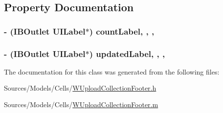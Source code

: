 \subsection{Property Documentation}
\hypertarget{interface_w_upload_collection_footer_a26070c07f674fc97b8c8a5a1c7985c48}{
\subsubsection[{count\-Label}]{\setlength{\rightskip}{0pt plus 5cm}-\/ (I\-B\-Outlet U\-I\-Label$\ast$) count\-Label\hspace{0.3cm}{\ttfamily [read]}, {\ttfamily [write]}, {\ttfamily [nonatomic]}, {\ttfamily [retain]}}}\label{interface_w_upload_collection_footer_a26070c07f674fc97b8c8a5a1c7985c48}
\hypertarget{interface_w_upload_collection_footer_add093d05ea9373e45275107472b7a78d}{
\subsubsection[{updated\-Label}]{\setlength{\rightskip}{0pt plus 5cm}-\/ (I\-B\-Outlet U\-I\-Label$\ast$) updated\-Label\hspace{0.3cm}{\ttfamily [read]}, {\ttfamily [write]}, {\ttfamily [nonatomic]}, {\ttfamily [retain]}}}\label{interface_w_upload_collection_footer_add093d05ea9373e45275107472b7a78d}


The documentation for this class was generated from the following files\-:\begin{DoxyCompactItemize}
\item 
Sources/\-Models/\-Cells/\hyperlink{_w_upload_collection_footer_8h}{W\-Upload\-Collection\-Footer.\-h}\item 
Sources/\-Models/\-Cells/\hyperlink{_w_upload_collection_footer_8m}{W\-Upload\-Collection\-Footer.\-m}\end{DoxyCompactItemize}
